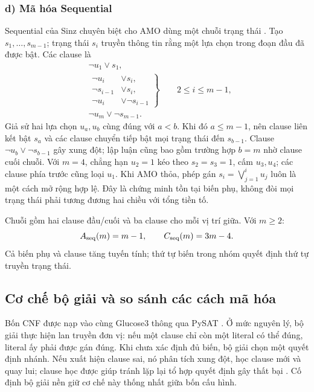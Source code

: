 \documentclass[a4paper]{cas-sc}
\begin{document}
\subsubsection*{d) Mã hóa Sequential}
Sequential của Sinz chuyên biệt cho AMO dùng một chuỗi trạng thái \citep{sinz2005}. Tạo $s_1,\ldots,s_{m-1}$; trạng thái $s_i$ truyền thông tin rằng một lựa chọn trong đoạn đầu đã được bật. Các clause là
\begin{equation}\label{eq:sequential}
\begin{aligned}
&\neg u_1\lor s_1,\\
&\left.\begin{aligned}
\neg u_i&\lor s_i,\\
\neg s_{i-1}&\lor s_i,\\
\neg u_i&\lor\neg s_{i-1}
\end{aligned}\right\}\qquad 2\le i\le m-1,\\
&\neg u_m\lor\neg s_{m-1}.
\end{aligned}
\end{equation}
Giả sử hai lựa chọn $u_a,u_b$ cùng đúng với $a<b$. Khi đó $a\le m-1$, nên clause liên kết bật $s_a$ và các clause chuyển tiếp bật mọi trạng thái đến $s_{b-1}$. Clause $\neg u_b\lor\neg s_{b-1}$ gây xung đột; lập luận cũng bao gồm trường hợp $b=m$ nhờ clause cuối chuỗi. Với $m=4$, chẳng hạn $u_2=1$ kéo theo $s_2=s_3=1$, cấm $u_3,u_4$; các clause phía trước cũng loại $u_1$. Khi AMO thỏa, phép gán $s_i=\bigvee_{j=1}^{i}u_j$ luôn là một cách mở rộng hợp lệ. Đây là chứng minh tồn tại biến phụ, không đòi mọi trạng thái phải tương đương hai chiều với tổng tiền tố.

Chuỗi gồm hai clause đầu/cuối và ba clause cho mỗi vị trí giữa. Với $m\ge2$:
\begin{equation}
A_{\rm seq}(m)=m-1,\qquad C_{\rm seq}(m)=3m-4.
\end{equation}
Cả biến phụ và clause tăng tuyến tính; thứ tự biến trong nhóm quyết định thứ tự truyền trạng thái.

\subsection{Cơ chế bộ giải và so sánh các cách mã hóa}
Bốn CNF được nạp vào cùng Glucose3 thông qua PySAT \citep{pysat2018,glucose2009}. Ở mức nguyên lý, bộ giải thực hiện lan truyền đơn vị: nếu một clause chỉ còn một literal có thể đúng, literal ấy phải được gán đúng. Khi chưa xác định đủ biến, bộ giải chọn một quyết định nhánh. Nếu xuất hiện clause sai, nó phân tích xung đột, học clause mới và quay lui; clause học được giúp tránh lặp lại tổ hợp quyết định gây thất bại \citep{minisat2003}. Cố định bộ giải nền giữ cơ chế này thống nhất giữa bốn cấu hình.
\end{document}
